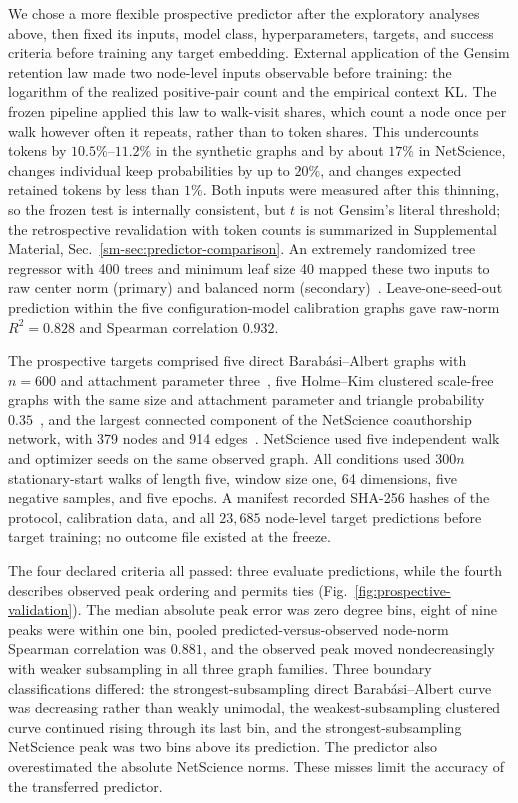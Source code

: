 \documentclass[aps,pre,reprint,superscriptaddress,longbibliography]{revtex4-2}
\begin{document}
We chose a more flexible prospective predictor after the exploratory analyses above, then fixed its inputs, model class, hyperparameters, targets, and success criteria before training any target embedding.
External application of the Gensim retention law made two node-level inputs observable before training: the logarithm of the realized positive-pair count and the empirical context KL.
The frozen pipeline applied this law to walk-visit shares, which count a node once per walk however often it repeats, rather than to token shares.
This undercounts tokens by \(10.5\%\)--\(11.2\%\) in the synthetic graphs and by about \(17\%\) in NetScience, changes individual keep probabilities by up to \(20\%\), and changes expected retained tokens by less than \(1\%\).
Both inputs were measured after this thinning, so the frozen test is internally consistent, but \(t\) is not Gensim's literal threshold; the retrospective revalidation with token counts is summarized in Supplemental Material, Sec.~\ref{sm-sec:predictor-comparison}.
An extremely randomized tree regressor with 400 trees and minimum leaf size 40 mapped these two inputs to raw center norm (primary) and balanced norm (secondary)~\citep{geurts2006extremely}.
Leave-one-seed-out prediction within the five configuration-model calibration graphs gave raw-norm \(R^2=0.828\) and Spearman correlation \(0.932\).

The prospective targets comprised five direct Barab\'asi--Albert graphs with \(n=600\) and attachment parameter three~\citep{barabasi1999emergence}, five Holme--Kim clustered scale-free graphs with the same size and attachment parameter and triangle probability \(0.35\)~\citep{holme2002growing}, and the largest connected component of the NetScience coauthorship network, with 379 nodes and 914 edges~\citep{newman2006finding}.
NetScience used five independent walk and optimizer seeds on the same observed graph.
All conditions used \(300n\) stationary-start walks of length five, window size one, 64 dimensions, five negative samples, and five epochs.
A manifest recorded SHA-256 hashes of the protocol, calibration data, and all \(23{,}685\) node-level target predictions before target training; no outcome file existed at the freeze.

The four declared criteria all passed: three evaluate predictions, while the fourth describes observed peak ordering and permits ties (Fig.~\ref{fig:prospective-validation}).
The median absolute peak error was zero degree bins, eight of nine peaks were within one bin, pooled predicted-versus-observed node-norm Spearman correlation was \(0.881\), and the observed peak moved nondecreasingly with weaker subsampling in all three graph families.
Three boundary classifications differed: the strongest-subsampling direct Barab\'asi--Albert curve was decreasing rather than weakly unimodal, the weakest-subsampling clustered curve continued rising through its last bin, and the strongest-subsampling NetScience peak was two bins above its prediction.
The predictor also overestimated the absolute NetScience norms.
These misses limit the accuracy of the transferred predictor.
\end{document}

